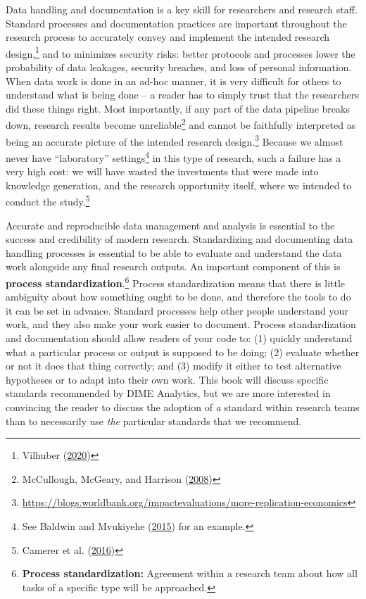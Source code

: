 \documentclass[
]{book}
\begin{document}
Data handling and documentation is a key skill for researchers and research staff.
Standard processes and documentation practices
are important throughout the research process to accurately convey
and implement the intended research design,\footnote{Vilhuber (\protect\hyperlink{ref-vilhuber_lars_2020_3911311}{2020})}
and to minimizes security risks:
better protocols and processes lower the probability of data leakages,
security breaches, and loss of personal information.
When data work is done in an ad-hoc manner,
it is very difficult for others to understand what is being done --
a reader has to simply trust that the researchers did these things right.
Most importantly, if any part of the data pipeline breaks down,
research results become unreliable\footnote{McCullough, McGeary, and Harrison (\protect\hyperlink{ref-mccullough2008economics}{2008})}
and cannot be faithfully interpreted
as being an accurate picture of the intended research design.\footnote{\url{https://blogs.worldbank.org/impactevaluations/more-replication-economics}}
Because we almost never have ``laboratory'' settings\footnote{See Baldwin and Mvukiyehe (\protect\hyperlink{ref-baldwin2015elections}{2015}) for an example.}
in this type of research,
such a failure has a very high cost:
we will have wasted the investments that were made into knowledge generation,
and the research opportunity itself,
where we intended to conduct the study.\footnote{Camerer et al. (\protect\hyperlink{ref-camerer2016evaluating}{2016})}

Accurate and reproducible data management and analysis
is essential to the success and credibility of modern research.
Standardizing and documenting data handling processes is essential
to be able to evaluate and understand
the data work alongside any final research outputs.
An important component of this is \textbf{process standardization}.\footnote{\textbf{Process standardization:} Agreement within a research team
  about how all tasks of a specific type will be approached.}
Process standardization means that there is
little ambiguity about how something ought to be done,
and therefore the tools to do it can be set in advance.
Standard processes help other people understand your work,
and they also make your work easier to document.
Process standardization and documentation should allow readers of your code to:
(1) quickly understand what a particular process or output is supposed to be doing;
(2) evaluate whether or not it does that thing correctly; and
(3) modify it either to test alternative hypotheses or to adapt into their own work.
This book will discuss specific standards recommended by DIME Analytics,
but we are more interested in convincing the reader
to discuss the adoption of \emph{a} standard within research teams
than to necessarily use \emph{the} particular standards that we recommend.
\end{document}
